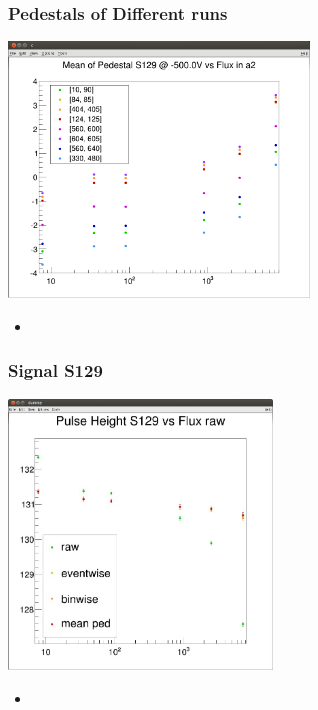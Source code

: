 \documentclass[9pt]{beamer}
\begin{document}
\begin{frame}
	\frametitle{Pedestals of Different runs}
	\begin{center}
		\includegraphics[width=8cm]{Pics/meanPedestals}
	\end{center}
	\begin{itemize}
		\item 
	\end{itemize}
\end{frame}
\begin{frame}
	\frametitle{Signal S129}
	\begin{center}
		\includegraphics[width=7cm]{Pics/sig129}
	\end{center}
	\begin{itemize}
		\item 
	\end{itemize}
\end{frame}
\end{document}
